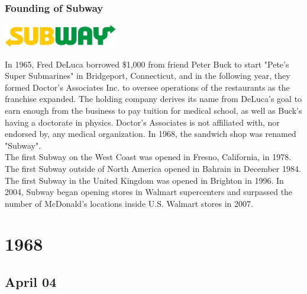 \documentclass[11pt]{report}
\begin{document}
\subsection{Founding of Subway}
\vspace{2mm}\begin{center}\includegraphics[width=5cm]{./img/subwayLogo.jpg}\end{center}
In 1965, Fred DeLuca borrowed \$1,000 from friend Peter Buck to start "Pete's Super Submarines" in Bridgeport, Connecticut, and in the following year, they formed Doctor's Associates Inc. to oversee operations of the restaurants as the franchise expanded. The holding company derives its name from DeLuca's goal to earn enough from the business to pay tuition for medical school, as well as Buck's having a doctorate in physics. Doctor's Associates is not affiliated with, nor endorsed by, any medical organization. In 1968, the sandwich shop was renamed "Subway".\\
\indent The first Subway on the West Coast was opened in Fresno, California, in 1978. The first Subway outside of North America opened in Bahrain in December 1984. The first Subway in the United Kingdom was opened in Brighton in 1996. In 2004, Subway began opening stores in Walmart supercenters and surpassed the number of McDonald's locations inside U.S. Walmart stores in 2007.

\chapter{1968}
\section{April 04}
\end{document}
